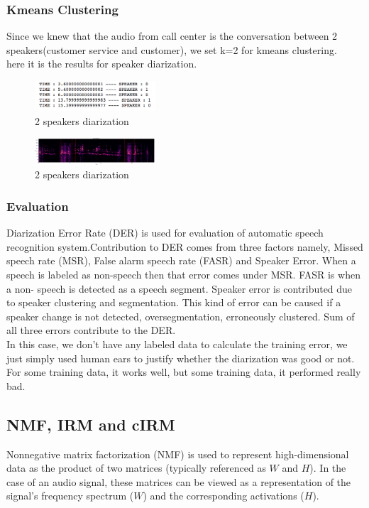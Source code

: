 \documentclass[journal, a4paper]{IEEEtran}
\begin{document}
\subsubsection{Kmeans Clustering}
Since we knew that the audio from call center is the conversation between 2 speakers(customer service and customer), we set k=2 for kmeans clustering.\\
here it is the results for speaker diarization.
\begin{figure}[h!]
    \centering  
     \caption{\label{Fig:speaker diarization 1}2 speakers diarization}  
    \includegraphics[width=0.4\textwidth]{kmeans01.png} 
\end{figure}

\begin{figure}[h!]
    \centering  
     \caption{\label{Fig:speaker diarization 2}2 speakers diarization}  
    \includegraphics[width=0.4\textwidth]{kmeans02.png}
\end{figure}
\subsubsection{Evaluation\cite{Segmentation}}Diarization Error Rate (DER) is used for evaluation of automatic speech recognition system.Contribution to DER comes from three factors namely, Missed speech rate (MSR), False alarm speech rate (FASR) and Speaker Error. When a speech is labeled as non-speech then that error comes under MSR. FASR is when a non- speech is detected as a speech segment. Speaker error is contributed due to speaker clustering and segmentation. This kind of error can be caused if a speaker change is not detected, oversegmentation, erroneously clustered. Sum of all three errors contribute to the DER.\\
In this case, we don't have any labeled data to calculate the training error, we just simply used human ears to justify whether the diarization was good or not. For some training data, it works well, but some training data, it performed really bad. 

\subsection{NMF, IRM and cIRM}
Nonnegative matrix factorization (NMF) is used to represent high-dimensional data as the product of two matrices (typically referenced as $W$ and $H$). In the case of an audio signal, these matrices can be viewed as a representation of the signal's frequency spectrum ($W$) and the corresponding activations ($H$).
\end{document}
